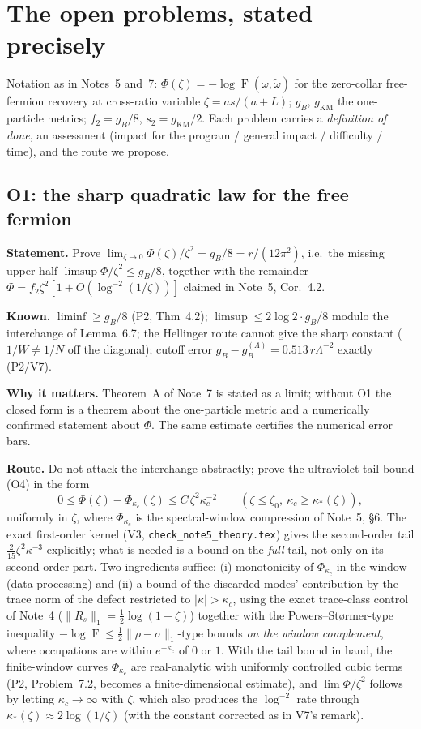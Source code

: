 \documentclass[11pt]{article}
\theoremstyle{accent}
\theoremstyle{definition}
\newcommand{\Fid}{\operatorname{F}}
\begin{document}
\section{The open problems, stated precisely}\label{sec:problems}

Notation as in Notes~5 and~7: \(\Phi(\zeta)=-\log\Fid(\omega,\widetilde\omega)\) for the zero-collar free-fermion recovery at cross-ratio variable \(\zeta=as/(a+L)\); \(g_B\), \(g_{\mathrm{KM}}\) the one-particle metrics; \(f_2=g_B/8\), \(s_2=g_{\mathrm{KM}}/2\).  Each problem carries a \emph{definition of done}, an assessment (impact for the program / general impact / difficulty / time), and the route we propose.

\subsection{O1: the sharp quadratic law for the free fermion}\label{sec:O1}
\textbf{Statement.} Prove \(\lim_{\zeta\to0}\Phi(\zeta)/\zeta^2=g_B/8=r/(12\pi^2)\), i.e.\ the missing upper half \(\limsup\Phi/\zeta^2\le g_B/8\), together with the remainder \(\Phi=f_2\zeta^2[1+O(\log^{-2}(1/\zeta))]\) claimed in Note~5, Cor.~4.2.

\textbf{Known.} \(\liminf\ge g_B/8\) (P2, Thm~4.2); \(\limsup\le2\log2\cdot g_B/8\) modulo the interchange of Lemma~6.7; the Hellinger route cannot give the sharp constant (\(1/W\neq1/N\) off the diagonal); cutoff error \(g_B-g_B^{(\Lambda)}=0.513\,r\Lambda^{-2}\) exactly (P2/V7).

\textbf{Why it matters.} Theorem~A of Note~7 is stated as a limit; without O1 the closed form is a theorem about the one-particle metric and a numerically confirmed statement about \(\Phi\).  The same estimate certifies the numerical error bars.

\textbf{Route.} Do not attack the interchange abstractly; prove the ultraviolet tail bound (O4) in the form
\[
 0\le\Phi(\zeta)-\Phi_{\kappa_c}(\zeta)\le C\,\zeta^2\kappa_c^{-2}\qquad(\zeta\le\zeta_0,\ \kappa_c\ge\kappa_*(\zeta)),
\]
uniformly in \(\zeta\), where \(\Phi_{\kappa_c}\) is the spectral-window compression of Note~5, \S6.  The exact first-order kernel (V3, \texttt{check\_note5\_theory.tex}) gives the second-order tail \(\frac2{15}\zeta^2\kappa^{-3}\) explicitly; what is needed is a bound on the \emph{full} tail, not only on its second-order part.  Two ingredients suffice: (i) monotonicity of \(\Phi_{\kappa_c}\) in the window (data processing) and (ii) a bound of the discarded modes' contribution by the trace norm of the defect restricted to \(|\kappa|>\kappa_c\), using the exact trace-class control of Note~4 (\(\|R_s\|_1=\frac12\log(1+\zeta)\)) together with the Powers--St\o rmer-type inequality \(-\log\Fid\le\frac12\|\rho-\sigma\|_1\)-type bounds \emph{on the window complement}, where occupations are within \(e^{-\kappa_c}\) of \(0\) or \(1\).  With the tail bound in hand, the finite-window curves \(\Phi_{\kappa_c}\) are real-analytic with uniformly controlled cubic terms (P2, Problem~7.2, becomes a finite-dimensional estimate), and \(\lim\Phi/\zeta^2\) follows by letting \(\kappa_c\to\infty\) with \(\zeta\), which also produces the \(\log^{-2}\) rate through \(\kappa_*(\zeta)\approx2\log(1/\zeta)\) (with the constant corrected as in V7's remark).
\end{document}
